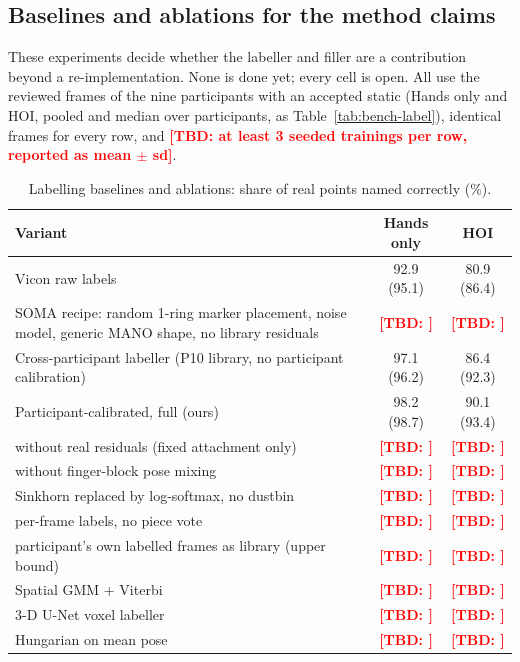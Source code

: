 \documentclass[11pt,a4paper]{article}
\newcommand{\tbd}[1]{\textcolor{red}{\textbf{[TBD: #1]}}}
\begin{document}
\subsection{Baselines and ablations for the method claims}\label{sec:val-ablate}
These experiments decide whether the labeller and filler are a contribution beyond a re-implementation. None is done
yet; every cell is open. All use the reviewed frames of the nine participants with an accepted static (Hands only and
HOI, pooled and median over participants, as Table~\ref{tab:bench-label}), identical frames for every row, and
\tbd{at least 3 seeded trainings per row, reported as mean $\pm$ sd}.
\begin{table}[h]\centering\small
\caption{Labelling baselines and ablations: share of real points named correctly (\%).}\label{tab:ablate-label}
\begin{tabular}{lcc}\toprule
Variant & Hands only & HOI \\\midrule
Vicon raw labels & 92.9 (95.1) & 80.9 (86.4) \\
SOMA recipe: random 1-ring marker placement, noise model, generic MANO shape, no library residuals & \tbd{} & \tbd{} \\
Cross-participant labeller (P10 library, no participant calibration) & 97.1 (96.2) & 86.4 (92.3) \\
Participant-calibrated, full (ours) & 98.2 (98.7) & 90.1 (93.4) \\
\quad without real residuals (fixed attachment only) & \tbd{} & \tbd{} \\
\quad without finger-block pose mixing & \tbd{} & \tbd{} \\
\quad Sinkhorn replaced by log-softmax, no dustbin & \tbd{} & \tbd{} \\
\quad per-frame labels, no piece vote & \tbd{} & \tbd{} \\
\quad participant's own labelled frames as library (upper bound) & \tbd{} & \tbd{} \\
Spatial GMM + Viterbi \citep{alexanderson2017labeling} & \tbd{} & \tbd{} \\
3-D U-Net voxel labeller & \tbd{} & \tbd{} \\
Hungarian on mean pose & \tbd{} & \tbd{} \\\bottomrule
\end{tabular}
\end{table}
\end{document}
